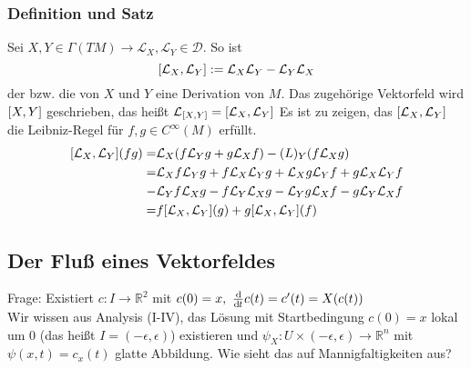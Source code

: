 \subsubsection{Definition und Satz}
\label{ssub:154}
Sei $X,Y \in \Gamma(TM) \to \mathcal{L}_X,\mathcal{L}_Y \in \mathcal{D}$. So ist 
\[
\benbrace*{\mathcal{L}_X,\mathcal{L}_Y}:= \mathcal{L}_X \mathcal{L}_Y - \mathcal{L}_Y \mathcal{L}_X 
\]
der  bzw. die  von $X$ und $Y$ eine Derivation von $M$. Das zugehörige Vektorfeld wird $\benbrace{X,Y}$ geschrieben, das heißt $\mathcal{L}_{\benbrace{X,Y}} = \benbrace*{\mathcal{L}_X,\mathcal{L}_Y}$
Es ist zu zeigen, das $\benbrace*{\mathcal{L}_X,\mathcal{L}_Y}$ die Leibniz-Regel für $f,g\in C^\infty (M)$ erfüllt.
\begin{align*}
\benbrace*{\mathcal{L}_X,\mathcal{L}_Y}(fg) 
=& \mathcal{L}_X \enbrace{f\mathcal{L}_Y g + g\mathcal{L}_X f} - \mathcal(L)_Y \enbrace{f\mathcal{L}_X g}\\ 
=& \mathcal{L}_X f \mathcal{L}_Y g + f \mathcal{L}_X \mathcal{L}_Y g + \mathcal{L}_X g \mathcal{L}_Y f + g \mathcal{L}_X \mathcal{L}_Y f \\
-& \mathcal{L}_Y f \mathcal{L}_X g - f \mathcal{L}_Y \mathcal{L}_X g - \mathcal{L}_Y g \mathcal{L}_X f - g \mathcal{L}_Y \mathcal{L}_X f\\
=& f\benbrace*{\mathcal{L}_X,\mathcal{L}_Y}(g) + g\benbrace*{\mathcal{L}_X,\mathcal{L}_Y}(f)
\end{align*}

\subsection{Der Fluß eines Vektorfeldes}
\label{sub:18}
\begin{wrapfigure}[8]{R}[1.5cm]{4cm}
\end{wrapfigure}
Frage: Existiert $c:I\to \mathds{R}^2$ mit $c(0) = x,\ \frac{\mathd}{\mathd t}c(t) = c'(t) = X(c(t))$\\
Wir wissen aus Analysis (I-IV), das Lösung mit Startbedingung $c(0) = x$ lokal um $0$ (das heißt $I = (-\epsilon,\epsilon)$) existieren und $\psi_X:U\times (-\epsilon,\epsilon) \to \mathds{R}^n$ mit $\psi(x,t) = c_x(t)$ glatte Abbildung. Wie sieht das auf Mannigfaltigkeiten aus?

